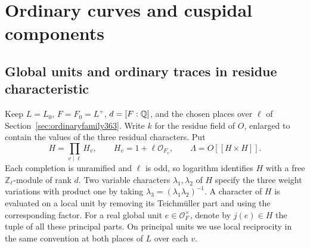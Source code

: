 \documentclass[a4paper,11pt]{article}
\theoremstyle{definition}
\theoremstyle{remark}
\newcommand{\ZZ}{\mathbb Z}\newcommand{\ord}{\operatorname{ord}}
\numberwithin{equation}{section}
\begin{document}
\section{Ordinary curves and cuspidal components}\label{nav:chapter-ordinary-families}
\subsection{Global units and ordinary traces in residue characteristic}
\label{sec:equalweights364}

Keep \(L=L_0\), \(F=F_0=L^+\), \(d=[F:\mathbb Q]\), and the chosen
places over \(\ell\) of Section~\ref{sec:ordinaryfamily363}.
Write \(k\) for the residue field of \(O\), enlarged to contain
the values of the three residual characters. Put
\[
 H=\prod_{v\mid\ell} H_v,\qquad H_v=1+\ell\mathcal O_{F_v},
 \qquad \Lambda=O[[H\times H]] .
\]
Each completion is unramified and \(\ell\) is odd, so logarithm
identifies \(H\) with a free \(\ZZ_\ell\)-module of rank \(d\).
Two variable characters \(\lambda_1,\lambda_2\) of \(H\)
specify the three weight variations with product one by taking
\(\lambda_3=(\lambda_1\lambda_2)^{-1}\). A character of \(H\)
is evaluated on a local unit by removing its Teichm\"uller part
and using the corresponding factor. For a real global unit
\(e\in\mathcal O_F^\times\), denote by \(j(e)\in H\) the
tuple of all these principal parts. On principal units we use
local reciprocity in the same convention at both places of \(L\)
over each \(v\).
\end{document}
